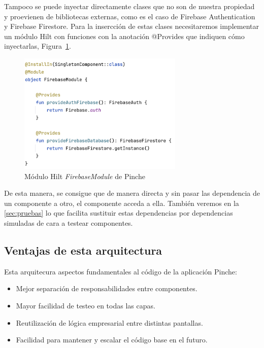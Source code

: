 Tampoco se puede inyectar directamente clases que no son de nuestra propiedad y proevienen de bibliotecas externas, como es el caso de Firebase Authentication y Firebase Firestore. Para la insercción de estas clases necesitaremos implementar un módulo Hilt con funciones con la anotación @Provides que indiquen cómo inyectarlas, Figura~\ref{fig:firebaseHilt}.

\begin{figure}[H]
\centering
\includegraphics[width=0.7\textwidth]{./img/description/firebase_hilt.png}
\caption{Módulo Hilt \textit{FirebaseModule} de Pinche}
\label{fig:firebaseHilt}
\end{figure}

De esta manera, se consigue que de manera directa y sin pasar las dependencia de un componente a otro, el componente acceda a ella. También veremos en la \autoref{sec:pruebas} lo que facilita sustituir estas dependencias por dependencias simuladas de cara a testear componentes.

\subsection{Ventajas de esta arquitectura}

Esta arquitecura aspectos fundamentales al código de la aplicación Pinche:

\begin{itemize}
    \item Mejor separación de responsabilidades entre componentes.
    \item Mayor facilidad de testeo en todas las capas.
    \item Reutilización de lógica empresarial entre distintas pantallas.
    \item Facilidad para mantener y escalar el código base en el futuro.
\end{itemize}

